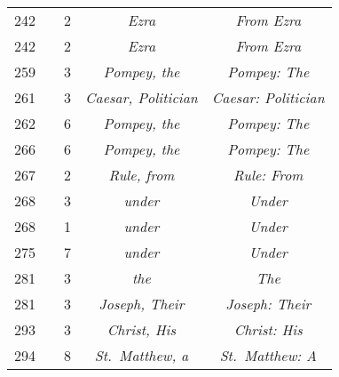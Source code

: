 \documentclass[a4paper,11pt]{article}
\begin{document}
\begin{center}
\begin{tabular}{|c|c|c|c|c|}
    242 & &  2 & \emph{Ezra} & \emph{From Ezra} \\
    242 & &  2 & \emph{Ezra} & \emph{From Ezra} \\
    259 & &  3 & \emph{Pompey, the} & \emph{Pompey: The} \\
    261 & &  3 & \emph{Caesar, Politician} & \emph{Caesar: Politician} \\
    262 & &  6 & \emph{Pompey, the} & \emph{Pompey: The} \\
    266 & &  6 & \emph{Pompey, the} & \emph{Pompey: The} \\
    267 & &  2 & \emph{Rule, from} & \emph{Rule: From} \\
    268 & &  3 & \emph{under} & \emph{Under} \\
    268 & &  1 & \emph{under} & \emph{Under} \\
    275 & &  7 & \emph{under} & \emph{Under} \\
    281 & &  3 & \emph{the} & \emph{The} \\
    281 & &  3 & \emph{Joseph, Their} & \emph{Joseph: Their} \\
    293 & &  3 & \emph{Christ, His} & \emph{Christ: His} \\
    294 & &  8 & \emph{St.~Matthew, a} & \emph{St.~Matthew: A} \\
    \hline
  \end{tabular}



\end{center}
\end{document}
